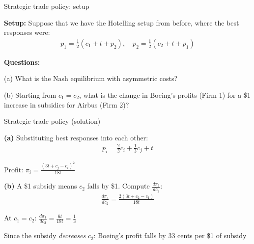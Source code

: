 \documentclass[notes,11pt, aspectratio=169]{beamer}
\newenvironment{wideitemize}{\itemize\addtolength{\itemsep}{10pt}}{\enditemize}
\begin{document}
\begin{frame}{Strategic trade policy: setup}
	\begin{wideitemize}
		\item \textbf{Setup:} Suppose that we have the Hotelling setup from before, where the best responses were:
		\begin{align*}
			p_1 = \frac{1}{2}(c_1+t+p_2), \quad p_2 = \frac{1}{2}(c_2+t+p_1)
		\end{align*}
		\item \textbf{Questions:}
		\item (a) What is the Nash equilibrium with asymmetric costs?
		\item (b) Starting from $c_1=c_2$, what is the change in Boeing's profits (Firm 1) for a \$1 increase in subsidies for Airbus (Firm 2)?
	\end{wideitemize}
\end{frame}

\begin{frame}{Strategic trade policy (solution)}
	\begin{wideitemize}
		\item \textbf{(a)} Substituting best responses into each other:
		\begin{align*}
			p_i = \frac{2}{3} c_i + \frac{1}{3}c_j + t
		\end{align*}
		\item Profit: $\pi_i = \frac{(3t + c_j - c_i)^2}{18t}$
		\item \textbf{(b)} A \$1 subsidy means $c_2$ falls by \$1. Compute $\frac{d \pi_1}{d c_2}$:
		\begin{align*}
			\frac{d \pi_1}{d c_2} = \frac{2(3t + c_2 - c_1)}{18t}
		\end{align*}
		\item At $c_1=c_2$: $\frac{d\pi_1}{dc_2} = \frac{6t}{18t} = \frac{1}{3}$
		\item Since the subsidy \textit{decreases} $c_2$: Boeing's profit falls by 33 cents per \$1 of subsidy
	\end{wideitemize}
\end{frame}

\end{document}

